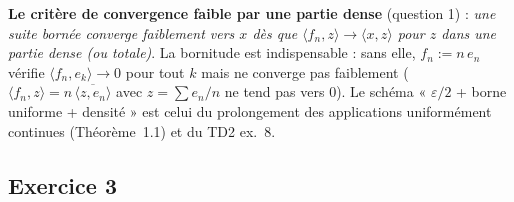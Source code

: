 \documentclass[11pt,a4paper]{article}
\theoremstyle{definition}
\begin{document}
\begin{pointcle}
\textbf{Le critère de convergence faible par une partie dense} (question 1) : \emph{une suite bornée converge faiblement vers $x$ dès que $\langle f_n,z\rangle\to\langle x,z\rangle$ pour $z$ dans une partie dense (ou totale)}. La bornitude est indispensable : sans elle, $f_n:=n\,e_n$ vérifie $\langle f_n,e_k\rangle\to0$ pour tout $k$ mais ne converge pas faiblement ($\langle f_n,z\rangle=n\,\overline{\langle z,e_n\rangle}$ avec $z=\sum e_n/n$ ne tend pas vers $0$). Le schéma « $\varepsilon/2$ + borne uniforme + densité » est celui du prolongement des applications uniformément continues (Théorème~1.1) et du TD2 ex.~8.
\end{pointcle}

\subsection*{Exercice 3}
\end{document}
